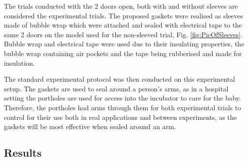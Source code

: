 \documentclass{article}
\begin{document}
The trials conducted with the 2 doors open, both with and without sleeves are considered the experimental trials.
The proposed gaskets were realised as sleeves made of bubble wrap which were attached and sealed with electrical tape to the same 2 doors on the model used for the non-sleeved trial, Fig. \ref{fig:PicOfSleeves}. Bubble wrap and electrical tape were used due to their insulating properties, the bubble wrap containing air pockets and the tape being rubberised and made for insulation.
\vspace{3mm}

The standard experimental protocol was then conducted on this experimental setup. 
The gaskets are used to seal around a person’s arms, as in a hospital setting the portholes are used for access into the incubator to care for the baby. Therefore, the portholes had arms through them for both experimental trials to control for their use both in real applications and between experiments, as the gaskets will be most effective when sealed around an arm. 


\subsection{Results}
\end{document}
